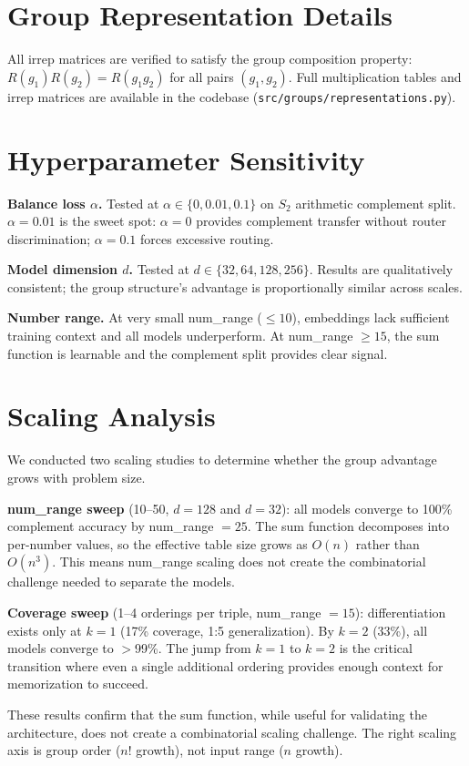 \documentclass[10pt, letterpaper]{article}
\begin{document}
\appendix

\section{Group Representation Details}
\label{app:groups}

All irrep matrices are verified to satisfy the group composition property: $R(g_1)R(g_2) = R(g_1 g_2)$ for all pairs $(g_1, g_2)$. Full multiplication tables and irrep matrices are available in the codebase (\texttt{src/groups/representations.py}).

\section{Hyperparameter Sensitivity}

\textbf{Balance loss $\alpha$.} Tested at $\alpha \in \{0, 0.01, 0.1\}$ on $S_2$ arithmetic complement split. $\alpha = 0.01$ is the sweet spot: $\alpha = 0$ provides complement transfer without router discrimination; $\alpha = 0.1$ forces excessive routing.

\textbf{Model dimension $d$.} Tested at $d \in \{32, 64, 128, 256\}$. Results are qualitatively consistent; the group structure's advantage is proportionally similar across scales.

\textbf{Number range.} At very small num\_range ($\leq 10$), embeddings lack sufficient training context and all models underperform. At num\_range $\geq 15$, the sum function is learnable and the complement split provides clear signal.

\section{Scaling Analysis}

We conducted two scaling studies to determine whether the group advantage grows with problem size.

\textbf{num\_range sweep} (10--50, $d = 128$ and $d = 32$): all models converge to 100\% complement accuracy by num\_range $= 25$. The sum function decomposes into per-number values, so the effective table size grows as $O(n)$ rather than $O(n^3)$. This means num\_range scaling does not create the combinatorial challenge needed to separate the models.

\textbf{Coverage sweep} (1--4 orderings per triple, num\_range $= 15$): differentiation exists only at $k = 1$ (17\% coverage, 1:5 generalization). By $k = 2$ (33\%), all models converge to $>$99\%. The jump from $k = 1$ to $k = 2$ is the critical transition where even a single additional ordering provides enough context for memorization to succeed.

These results confirm that the sum function, while useful for validating the architecture, does not create a combinatorial scaling challenge. The right scaling axis is group order ($n!$ growth), not input range ($n$ growth).
\end{document}
